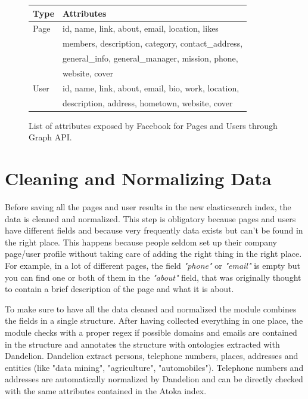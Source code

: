 \begin{figure}
\begin{tabular}{| l | l |}
    \hline
    Type & Attributes \\ \hline
    Page & id, name, link, about, email, location, likes\\
         & members, description, category, contact\_address,\\
         & general\_info, general\_manager, mission, phone,\\
         & website, cover\\
    \hline
    User & id, name, link, about, email, bio, work, location,\\
         & description, address, hometown, website, cover\\
    \hline
\end{tabular}
    \caption{List of attributes exposed by Facebook for Pages and Users through Graph API.}
    \label{Fig.3}
\end{figure}

\section{Cleaning and Normalizing Data}

Before saving all the pages and user results in the new elasticsearch index, the data is cleaned and normalized. This step is obligatory because pages and users have different fields and because very frequently data exists but can't be found in the right place. This happens because people seldom set up their company page/user profile without taking care of adding the right thing in the right place. For example, in a lot of different pages, the field \textit{"phone"} or \textit{"email"} is empty but you can find one or both of them in the \textit{"about"} field, that was originally thought to contain a brief description of the page and what it is about.

To make sure to have all the data cleaned and normalized the module combines the fields in a single structure. After having collected everything in one place, the module checks with a proper regex if possible domains and emails are contained in the structure and annotates the structure with ontologies extracted with Dandelion. Dandelion extract persons, telephone numbers, places, addresses and entities (like "data mining", "agriculture", "automobiles").
Telephone numbers and addresses are automatically normalized by Dandelion and can be directly checked with the same attributes contained in the Atoka index.

